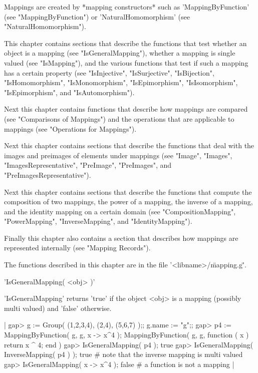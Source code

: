 Mappings    are   created    by    *mapping    constructors*    such   as
'MappingByFunction'  (see  "MappingByFunction") or  'NaturalHomomorphism'
(see "NaturalHomomorphism").

This  chapter contains sections  that  describe the  functions that  test
whether  an  object  is  a  mapping  (see "IsGeneralMapping"), whether  a
mapping  is single valued (see  "IsMapping"), and  the various  functions
that  test if such a mapping has a  certain property (see  "IsInjective",
"IsSurjective",    "IsBijection",   "IsHomomorphism",   "IsMonomorphism",
"IsEpimorphism", "IsIsomorphism", "IsEpimorphism", and "IsAutomorphism").

Next  this chapter  contains functions that  describe  how  mappings  are
compared  (see  "Comparisons  of Mappings")  and the operations  that are
applicable to mappings (see "Operations for Mappings").

Next this chapter contains sections that describe the functions that deal
with the  images and preimages of elements  under  mappings (see "Image",
"Images",   "ImagesRepresentative",   "PreImage",     "PreImages",    and
"PreImagesRepresentative").

Next  this  chapter contains sections that  describe the  functions  that
compute  the  composition  of two mappings,  the  power of a mapping, the
inverse of a mapping, and the  identity mapping  on a certain domain (see
"CompositionMapping",     "PowerMapping",      "InverseMapping",      and
"IdentityMapping").

Finally this chapter also contains a section  that describes how mappings
are represented internally (see "Mapping Records").

The   functions   described   in   this   chapter   are   in   the   file
'<libname>/\"mapping.g\"'.


'IsGeneralMapping( <obj> )'

'IsGeneralMapping'  returns  'true'  if the  object  <obj>  is a  mapping
(possibly multi valued) and 'false' otherwise.

|    gap> g := Group( (1,2,3,4), (2,4), (5,6,7) );;  g.name := "g";;
    gap> p4 := MappingByFunction( g, g, x -> x^4 );
    MappingByFunction( g, g, function ( x )
        return x ^ 4;
    end )
    gap> IsGeneralMapping( p4 );
    true
    gap> IsGeneralMapping( InverseMapping( p4 ) );
    true    # note that the inverse mapping is multi valued
    gap> IsGeneralMapping( x -> x^4 );
    false    # a function is not a mapping |

